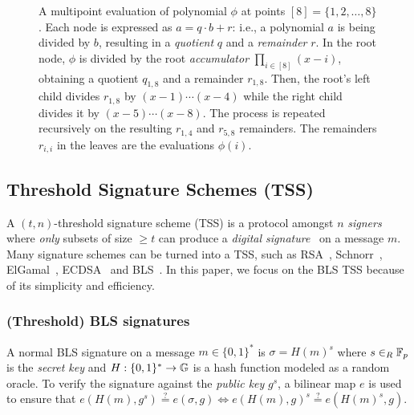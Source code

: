 {\begin{figure*}[t]
\caption{A multipoint evaluation of polynomial $\phi$ at points $[8]=\{1,2,\dots, 8\}$.
    Each node is expressed as $a = q \cdot b + r$: i.e., a polynomial $a$ is being divided by $b$, resulting in a \textit{quotient} $q$ and a \textit{remainder} $r$.
    In the root node, $\phi$ is divided by the root \textit{accumulator} $\prod_{i\in[8]}(x-i)$, obtaining a quotient $q_{1,8}$ and a remainder $r_{1,8}$.
    Then, the root's left child divides $r_{1,8}$ by $(x-1)\cdots(x-4)$ while the right child divides it by $(x-5)\cdots(x-8)$.
    The process is repeated recursively on the resulting $r_{1,4}$ and $r_{5,8}$ remainders.
    The remainders $r_{i,i}$ in the leaves are the evaluations $\phi(i)$.}
\label{f:multipoint-eval}
\end{figure*}
}

\subsection{Threshold Signature Schemes (TSS)}
\label{s:prelim:threshsig}

A $(t,n)$-threshold signature scheme (TSS) is a protocol amongst $n$ \textit{signers} where \textit{only} subsets of size $\ge t$ can produce a \textit{digital signature}~\cite{rsa} on a message $m$.
Many signature schemes can be turned into a TSS, such as RSA~\cite{rsa,Shoup2000Practical}, Schnorr~\cite{Schnorr89,threshold-schnorr,Gennaro2003SecureApplications}, ElGamal~\cite{ElGamal1985APublicKey,Harn1994GroupOriented,Park96NewElGamal,Gennaro1996Robust}, ECDSA~\cite{GennaroGoldfederNarayanan2016ThresholdOptimal} and BLS~\cite{bls,Boldyreva2003Threshold}.
In this paper, we focus on the BLS TSS because of its simplicity and efficiency.

\subsubsection{(Threshold) BLS signatures}
A normal BLS signature on a message $m\in \{0,1\}^*$ is $\sigma = H(m)^s$ where $s\in_R \mathbb{F}_p$ is the \textit{secret key} and $H : \{0,1\}^* \rightarrow \mathbb{G}$ is a hash function modeled as a random oracle.
To verify the signature against the \textit{public key} $g^s$, a bilinear map $e$ is used to ensure that $e(H(m), g^s) \stackrel{?}{=} e(\sigma, g)\Leftrightarrow e(H(m),g)^s \stackrel{?}{=} e(H(m)^s, g)$.

